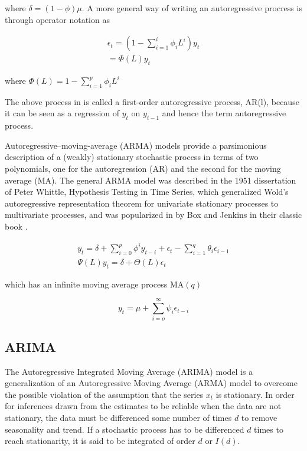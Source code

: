 \documentclass[
  11pt,
]{article}
\begin{document}
where \(\delta = (1 - \phi)\mu\). A more general way of writing an
autoregressive procress is through operator notation as

\begin{gather*}
\epsilon_{t} = \left(1 - \sum\limits_{i=1}^{i}\phi_{i}L^{i} \right)y_{t} \\[8pt]
 = \Phi(L)y_{t}
\end{gather*}

where \(\Phi(L) = 1 - \sum\limits_{i=1}^{p}\phi_{i}L^{i}\)

The above process in is called a first-order autoregressive process,
AR(l), because it can be seen as a regression of \(y_{t}\) on
\(y_{t-1}\) and hence the term autoregressive process.

Autoregressive--moving-average (ARMA) models provide a parsimonious
description of a (weakly) stationary stochastic process in terms of two
polynomials, one for the autoregression (AR) and the second for the
moving average (MA). The general ARMA model was described in the 1951
dissertation of Peter Whittle, Hypothesis Testing in Time Series, which
generalized Wold's autoregressive representation theorem for univariate
stationary processes to multivariate processes, and was popularized in
by Box and Jenkins in their classic book \cite{box70}.

\begin{gather*}
y_{t} = \delta + \sum\limits_{i=0}^{p}\phi^{i}y_{t- i} + \epsilon_{t} - \sum\limits_{i=1}^{q}\theta_{i}\epsilon_{i-1} \\[8pt]
\Psi(L)y_{t} = \delta + \Theta(L)\epsilon_{t} 
\end{gather*}

which has an infinite moving average process \(\mathrm{MA}(q)\)

\[
y_{t} = \mu + \sum\limits_{i= o}^{\infty}\psi_{i}\epsilon_{t-i}
\]

\hypertarget{arima}{%
\subsection{ARIMA}\label{arima}}

The Autoregressive Integrated Moving Average (ARIMA) model is a
generalization of an Autoregressive Moving Average (ARMA) model to
overcome the possible violation of the assumption that the series
\(x_{t}\) is stationary. In order for inferences drawn from the
estimates to be reliable when the data are not stationary, the data must
be differenced some number of times \(d\) to remove seasonality and
trend. If a stochastic process has to be differenced \(d\) times to
reach stationarity, it is said to be integrated of order \(d\) or
\(I(d)\).
\end{document}

